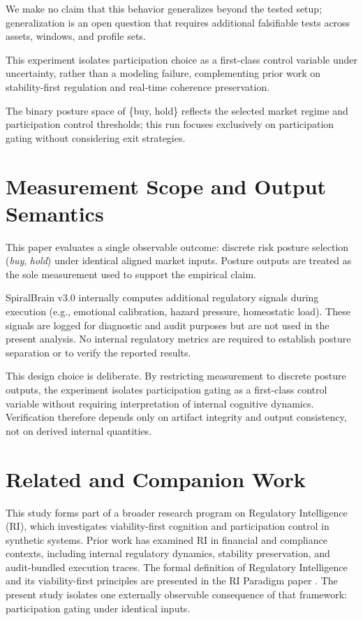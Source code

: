 \documentclass[12pt,a4paper]{article}
\begin{document}
We make no claim that this behavior generalizes beyond the tested setup; generalization is an open question that requires additional falsifiable tests across assets, windows, and profile sets.

This experiment isolates participation choice as a first-class control variable under uncertainty, rather than a modeling failure, complementing prior work on stability-first regulation and real-time coherence preservation.

The binary posture space of \{buy, hold\} reflects the selected market regime and participation control thresholds; this run focuses exclusively on participation gating without considering exit strategies.

\section{Measurement Scope and Output Semantics}

This paper evaluates a single observable outcome: discrete risk posture selection
(\emph{buy}, \emph{hold}) under identical aligned market inputs.
Posture outputs are treated as the sole measurement used to support the empirical claim.

SpiralBrain v3.0 internally computes additional regulatory signals during execution
(e.g., emotional calibration, hazard pressure, homeostatic load). These signals are logged
for diagnostic and audit purposes but are not used in the present analysis.
No internal regulatory metrics are required to establish posture separation or to verify
the reported results.

This design choice is deliberate. By restricting measurement to discrete posture outputs,
the experiment isolates participation gating as a first-class control variable without
requiring interpretation of internal cognitive dynamics. Verification therefore depends
only on artifact integrity and output consistency, not on derived internal quantities.

\section{Related and Companion Work}

This study forms part of a broader research program on Regulatory Intelligence (RI),
which investigates viability-first cognition and participation control in synthetic systems.
Prior work has examined RI in financial and compliance contexts, including internal
regulatory dynamics, stability preservation, and audit-bundled execution traces.
The formal definition of Regulatory Intelligence and its viability-first principles are presented in the RI Paradigm paper \cite{Cragin2026RIParadigm}. The present study isolates one externally observable consequence of that framework: participation gating under identical inputs.
\end{document}
